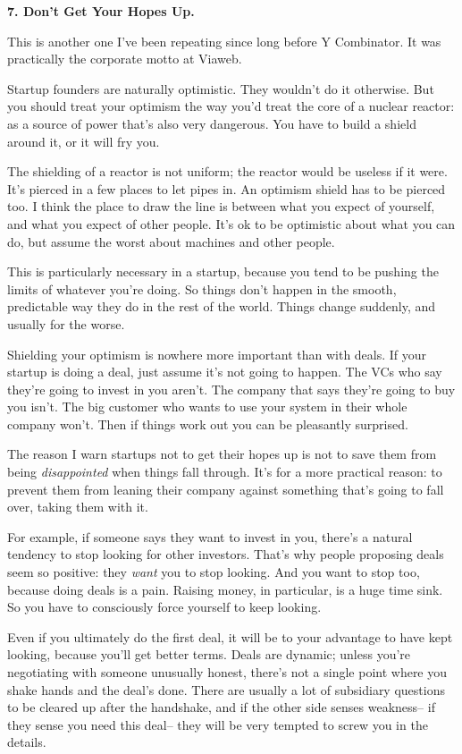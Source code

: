 \textbf{7. Don't Get Your Hopes Up.}

This is another one I've been repeating since long before Y Combinator.
It was practically the corporate motto at Viaweb.

Startup founders are naturally optimistic.  They wouldn't do it
otherwise.  But you should treat your optimism the way you'd treat
the core of a nuclear reactor: as a source of power that's also
very dangerous.  You have to build a shield around it, or it will
fry you.

The shielding of a reactor is not uniform; the reactor would be
useless if it were.  It's pierced in a few places to let pipes in.
An optimism shield has to be pierced too.  I think the place to
draw the line is between what you expect of yourself, and what you
expect of other people.  It's ok to be optimistic about what you
can do, but assume the worst about machines and other people.

This is particularly necessary in a startup, because you tend to
be pushing the limits of whatever you're doing.  So things don't
happen in the smooth, predictable way they do in the rest of the
world.  Things change suddenly, and usually for the worse.

Shielding your optimism is nowhere more important than with deals.
If your startup is doing a deal, just assume it's not going to
happen.  The VCs who say they're going to invest in you aren't.
The company that says they're going to buy you isn't.  The big
customer who wants to use your system in their whole company won't.
Then if things work out you can be pleasantly surprised.

The reason I warn startups not to get their hopes up is not to save
them from being \emph{disappointed} when things fall through.  It's
for a more practical reason: to prevent them from leaning their
company against something that's going to fall over, taking them
with it.

For example, if someone says they want to invest in you, there's a
natural tendency to stop looking for other investors.  That's why
people proposing deals seem so positive: they \emph{want} you to
stop looking.  And you want to stop too, because doing deals is a
pain.  Raising money, in particular, is a huge time sink.  So you
have to consciously force yourself to keep looking.

Even if you ultimately do the first deal, it will be to your advantage
to have kept looking, because you'll get better terms.  Deals are
dynamic; unless you're negotiating with someone unusually honest,
there's not a single point where you shake hands and the deal's
done. There are usually a lot of subsidiary questions to be cleared
up after the handshake, and if the other side senses weakness-- if
they sense you need this deal-- they will be very tempted to screw
you in the details.

